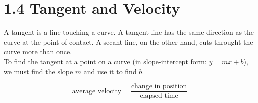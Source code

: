 %
%

\section*{1.4 Tangent and Velocity} 

A tangent is a line touching a curve. A tangent line has the same direction as the curve at the point of contact. A secant line, on the other hand, cuts throught the curve more than once.\\

To find the tangent at a point on a curve (in slope-intercept form: \(y=mx+b\)), we must find the slope \(m\) and use it to find \(b\). 

$$\text{average velocity} = \frac{\text{change in position}}{\text{elapsed time}}$$ 
